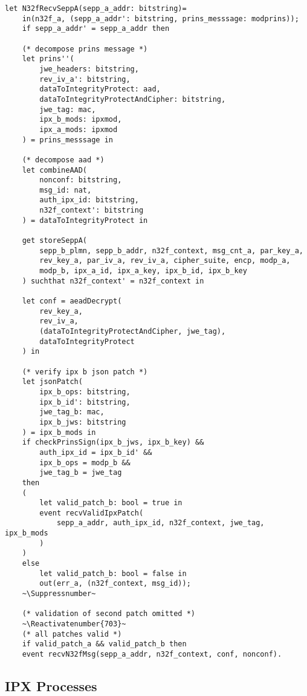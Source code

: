 \lstset{escapeinside=~~}
\begin{lstlisting}[caption={Definition of the receiving N32-f signaling transmission process},label={lst:n32f-recv},firstnumber=623]
let N32fRecvSeppA(sepp_a_addr: bitstring)=
    in(n32f_a, (sepp_a_addr': bitstring, prins_messsage: modprins));
    if sepp_a_addr' = sepp_a_addr then

    (* decompose prins message *)
    let prins''(
        jwe_headers: bitstring,
        rev_iv_a': bitstring,
        dataToIntegrityProtect: aad,
        dataToIntegrityProtectAndCipher: bitstring,
        jwe_tag: mac,
        ipx_b_mods: ipxmod,
        ipx_a_mods: ipxmod
    ) = prins_messsage in

    (* decompose aad *)
    let combineAAD(
        nonconf: bitstring,
        msg_id: nat,
        auth_ipx_id: bitstring,
        n32f_context': bitstring
    ) = dataToIntegrityProtect in

    get storeSeppA(
        sepp_b_plmn, sepp_b_addr, n32f_context, msg_cnt_a, par_key_a,
        rev_key_a, par_iv_a, rev_iv_a, cipher_suite, encp, modp_a,
        modp_b, ipx_a_id, ipx_a_key, ipx_b_id, ipx_b_key
    ) suchthat n32f_context' = n32f_context in

    let conf = aeadDecrypt(
        rev_key_a,
        rev_iv_a,
        (dataToIntegrityProtectAndCipher, jwe_tag),
        dataToIntegrityProtect
    ) in

    (* verify ipx b json patch *)
    let jsonPatch(
        ipx_b_ops: bitstring,
        ipx_b_id': bitstring,
        jwe_tag_b: mac,
        ipx_b_jws: bitstring
    ) = ipx_b_mods in
    if checkPrinsSign(ipx_b_jws, ipx_b_key) &&
        auth_ipx_id = ipx_b_id' &&
        ipx_b_ops = modp_b &&
        jwe_tag_b = jwe_tag
    then
    (
        let valid_patch_b: bool = true in
        event recvValidIpxPatch(
            sepp_a_addr, auth_ipx_id, n32f_context, jwe_tag, ipx_b_mods
        )
    )
    else
        let valid_patch_b: bool = false in
        out(err_a, (n32f_context, msg_id));
    ~\Suppressnumber~

    (* validation of second patch omitted *)
    ~\Reactivatenumber{703}~
    (* all patches valid *)
    if valid_patch_a && valid_patch_b then
    event recvN32fMsg(sepp_a_addr, n32f_context, conf, nonconf).
\end{lstlisting}

\subsection{IPX Processes}

